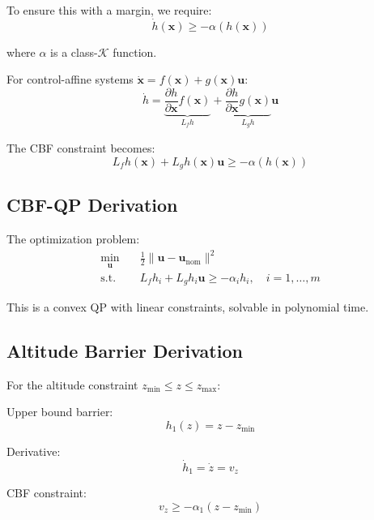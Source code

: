 To ensure this with a margin, we require:
\begin{equation}
    \dot{h}(\mathbf{x}) \geq -\alpha(h(\mathbf{x}))
\end{equation}

where $\alpha$ is a class-$\mathcal{K}$ function.

For control-affine systems $\dot{\mathbf{x}} = f(\mathbf{x}) + g(\mathbf{x})\mathbf{u}$:
\begin{equation}
    \dot{h} = \underbrace{\frac{\partial h}{\partial \mathbf{x}} f(\mathbf{x})}_{L_f h} + \underbrace{\frac{\partial h}{\partial \mathbf{x}} g(\mathbf{x})}_{L_g h} \mathbf{u}
\end{equation}

The CBF constraint becomes:
\begin{equation}
    L_f h(\mathbf{x}) + L_g h(\mathbf{x}) \mathbf{u} \geq -\alpha(h(\mathbf{x}))
\end{equation}

\subsection{CBF-QP Derivation}

The optimization problem:
\begin{align}
    \min_{\mathbf{u}} \quad & \frac{1}{2}\|\mathbf{u} - \mathbf{u}_{\text{nom}}\|^2 \\
    \text{s.t.} \quad & L_f h_i + L_g h_i \mathbf{u} \geq -\alpha_i h_i, \quad i = 1, \ldots, m
\end{align}

This is a convex QP with linear constraints, solvable in polynomial time.

\subsection{Altitude Barrier Derivation}

For the altitude constraint $z_{\min} \leq z \leq z_{\max}$:

Upper bound barrier:
\begin{equation}
    h_1(z) = z - z_{\min}
\end{equation}

Derivative:
\begin{equation}
    \dot{h}_1 = \dot{z} = v_z
\end{equation}

CBF constraint:
\begin{equation}
    v_z \geq -\alpha_1(z - z_{\min})
\end{equation}

